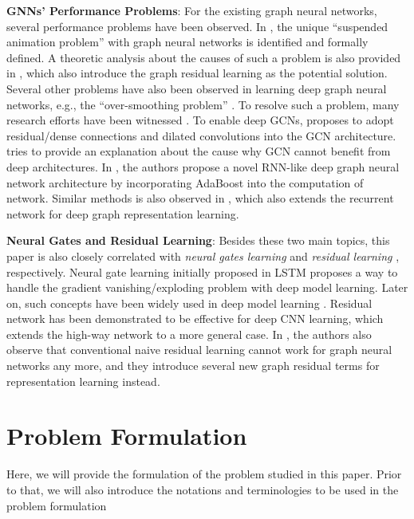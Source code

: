 \documentclass{article}
\begin{document}
\noindent \textbf{GNNs' Performance Problems}: For the existing graph neural networks, several performance problems have been observed. In \cite{Zhang_GResNet_19}, the unique ``suspended animation problem'' with graph neural networks is identified and formally defined. A theoretic analysis about the causes of such a problem is also provided in \cite{Zhang_GResNet_19}, which also introduce the graph residual learning as the potential solution. Several other problems have also been observed in learning deep graph neural networks, e.g., the ``over-smoothing problem'' \cite{Li_Deeper_18}. To resolve such a problem, many research efforts have been witnessed \cite{Li_Can_19,Merve_An_19,Sun_AdaGCNAG_19,Huang_Inductive_19}. To enable deep GCNs, \cite{Li_Can_19} proposes to adopt residual/dense connections and dilated convolutions into the GCN architecture. \cite{Merve_An_19} tries to provide an explanation about the cause why GCN cannot benefit from deep architectures. In \cite{Sun_AdaGCNAG_19}, the authors propose a novel RNN-like deep graph neural network architecture by incorporating AdaBoost into the computation of network. Similar methods is also observed in \cite{Huang_Inductive_19}, which also extends the recurrent network for deep graph representation learning.

\noindent \textbf{Neural Gates and Residual Learning}: Besides these two main topics, this paper is also closely correlated with \textit{neural gates learning} \cite{Hochreiter_Long_97,Chung_Empirical_14} and \textit{residual learning} \cite{Kumar_Highway_15,He_Deep_15,Zhang_GResNet_19}, respectively. Neural gate learning initially proposed in LSTM \cite{Hochreiter_Long_97} proposes a way to handle the gradient vanishing/exploding problem with deep model learning. Later on, such concepts have been widely used in deep model learning \cite{Chung_Empirical_14,Gao2016DeepGR}. Residual network \cite{He_Deep_15} has been demonstrated to be effective for deep CNN learning, which extends the high-way network \cite{Kumar_Highway_15} to a more general case. In \cite{Zhang_GResNet_19}, the authors also observe that conventional naive residual learning cannot work for graph neural networks any more, and they introduce several new graph residual terms for representation learning instead.  
\section{Problem Formulation}\label{sec:formulate}

Here, we will provide the formulation of the problem studied in this paper. Prior to that, we will also introduce the notations and terminologies to be used in the problem formulation
\end{document}
